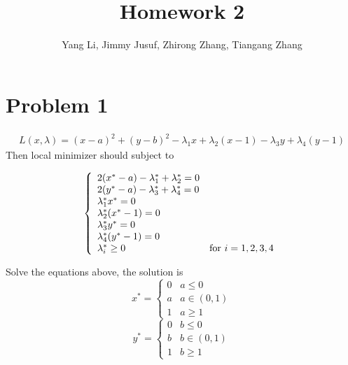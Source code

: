 \documentclass{article}
\title{Homework 2}
\author{Yang Li, Jimmy Jusuf, Zhirong Zhang, Tiangang Zhang }
\begin{document}
\maketitle


\section*{Problem 1}
\begin{eqnarray*}
L(x,\lambda)=(x-a)^2+(y-b)^2-\lambda_1 x+\lambda_2 (x-1)-\lambda_3 y +\lambda_4 (y-1)
\end{eqnarray*}
Then local minimizer should subject to

\begin{equation}  
\left\{  
             \begin{array}{ll}
             2(x^*-a)-\lambda_1^*+\lambda_2^*=0\\  
             2(y^*-a)-\lambda_3^*+\lambda_4^*=0\\
             \lambda_1^* x^*=0\\
             \lambda_2^*(x^*-1)=0\\
             \lambda_3^* y^*=0\\
             \lambda_4^*(y^*-1)=0\\
             \lambda_i^* \geq 0 & \textnormal{for~} i=1,2,3,4
             \end{array}  
\right.  
\end{equation}  

Solve the equations above, the solution is
\begin{equation}  
x^*=
\left\{  
             \begin{array}{ll}
             0 & a\leq 0\\
             a & a \in (0,1) \\
             1 & a \geq 1
             \end{array}  
\right.  
\end{equation} 
\begin{equation}  
y^*=
\left\{  
             \begin{array}{ll}
             0 & b\leq 0\\
             b & b \in (0,1) \\
             1 & b \geq 1
             \end{array}  
\right.  
\end{equation}  
\end{document}
